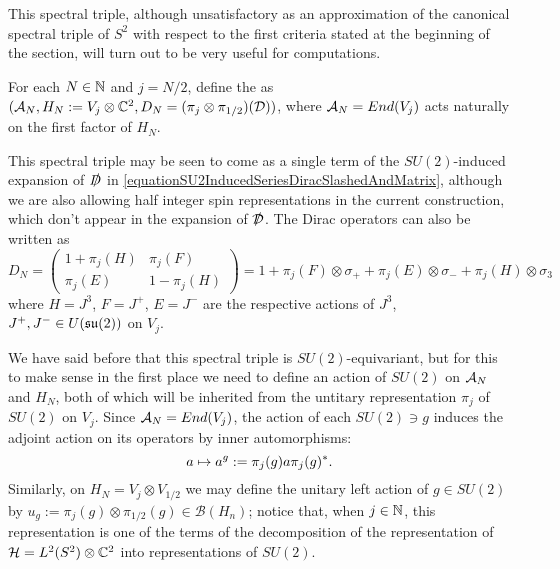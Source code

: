         
    
        

This spectral triple, although unsatisfactory as an approximation of the canonical spectral triple of $S^2$ with respect to the first criteria stated at the beginning of the section, will turn out to be very useful for computations.

\begin{definition}
For each $N \in \mathbb{N}$ and $j = N/2$, define the  as $(\mathcal A_N, \textcolor{black}{H_N} := V_j \otimes \mathbb{C}^2, D_N = (\pi_j \otimes \pi_{1/2})(\mathcal D))$, where $\mathcal A_N = End(V_j)$ acts naturally on the first factor of $H_N$.
\end{definition}

This spectral triple may be seen to come as a single term of the $SU(2)$-induced expansion of $\slashed D$ in \eqref{equationSU2InducedSeriesDiracSlashedAndMatrix}, although we are also allowing  half integer spin representations in the current construction, which don't appear in the expansion of $\slashed {\mathcal D}$. The Dirac operators can also be written as
\begin{equation}
    D_N = \begin{pmatrix} 1 + \pi_j(H) & \pi_j(F) \\ \pi_j(E) & 1 - \pi_j(H)\end{pmatrix} 
    = 1 + \pi_j(F) \otimes \sigma_+ + \pi_j(E) \otimes \sigma_- + \pi_j(H) \otimes \sigma_3
\end{equation}
where $H = J^3$, $F = J^+$, $E = J^-$ are the respective actions of $J^3$, $J^+, J^- \in U(\mathfrak{su}(2))$ on $V_j$.

We have said before that this spectral triple is $SU(2)$-equivariant, but for this to make sense in the first place we need to define an action of $SU(2)$ on $\mathcal A_N$ and $H_N$, both of which will be inherited from the untitary representation $\pi_j$ of $SU(2)$ on $V_j$. Since $\mathcal A_N = End(V_j)$, the action of each $SU(2) \ni g$ induces the adjoint action on its operators by inner automorphisms:
\begin{equation}
    a \mapsto \textcolor{black}{a^g} := \pi_j(g) a \pi_j(g)^*.
\end{equation} 
Similarly, on $H_N = V_j \otimes V_{1/2}$ we may define the unitary left action of $g \in SU(2)$ by $u_g := \pi_j(g) \otimes \pi_{1/2}(g) \in \mathcal B(H_n)$; notice that, when $j \in \mathbb{N}$, this representation is one of the terms of the decomposition of the representation of $\mathcal H = L^2(S^2) \otimes \mathbb{C}^2$ into representations of $SU(2)$.

